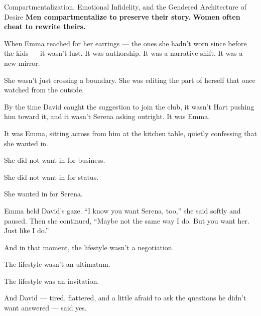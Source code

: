 \begin{PsychologicalSidebar}{Compartmentalization, Emotional Infidelity, and the Gendered Architecture of Desire}
  \textbf{Men compartmentalize to preserve their story.}  
  \textbf{Women often cheat to rewrite theirs.}  

  \medskip
  
  When Emma reached for her earrings --- the ones she hadn’t worn since before the kids --- it wasn’t lust.  
  It was authorship.  
  It was a narrative shift.  
  It was a new mirror.
  
  \medskip
  
  She wasn’t just crossing a boundary.  
  She was editing the part of herself that once watched from the outside.
  
\end{PsychologicalSidebar}

\medskip

By the time David caught the suggestion to join the club, it wasn’t Hart pushing him toward it, and it wasn’t Serena asking 
outright. It was Emma.  

It was Emma, sitting across from him at the kitchen table, quietly confessing that she wanted in.  

She did not want in for business.  

She did not want in for status.  

She wanted in for Serena.

Emma held David's gaze.  ``I know you want Serena, too,'' she said softly and paused.  
Then she continued, ``Maybe not the same way I do. But you want her. Just like I do.''

And in that moment, the lifestyle wasn’t a negotiation.  

The lifestyle wasn’t an ultimatum.  

The lifestyle was an invitation.

And David --- tired, flattered, and a little afraid to ask the questions he didn’t want answered ---  
said yes.

\medskip

